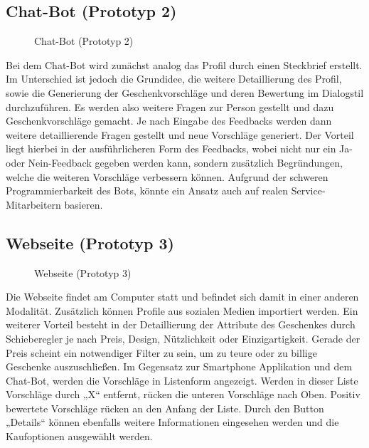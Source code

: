 \documentclass[12pt,ngerman, fleqn]{book} %
\begin{document}
\subsection{Chat-Bot (Prototyp 2)}
\begin{figure}[ht]
    \centering
    \caption{Chat-Bot (Prototyp 2)}
    \label{fig:proto2}
\end{figure}

Bei dem Chat-Bot wird zunächst analog das Profil durch einen Steckbrief erstellt. Im Unterschied ist jedoch die Grundidee, die weitere Detaillierung des Profil, sowie die Generierung der Geschenkvorschläge und deren Bewertung im Dialogstil durchzuführen. Es werden also weitere Fragen zur Person gestellt und dazu Geschenkvorschläge gemacht. Je nach Eingabe des Feedbacks werden dann weitere detaillierende Fragen gestellt und neue Vorschläge generiert. Der Vorteil liegt hierbei in der ausführlicheren Form des Feedbacks, wobei nicht nur ein Ja- oder Nein-Feedback gegeben werden kann, sondern zusätzlich Begründungen, welche die weiteren Vorschläge verbessern können. Aufgrund der schweren Programmierbarkeit des Bots, könnte ein Ansatz auch auf realen Service-Mitarbeitern basieren.

\subsection{Webseite (Prototyp 3)}
\begin{figure}[ht]
    \centering
    \caption{Webseite (Prototyp 3)}
    \label{fig:proto3}
\end{figure}

Die Webseite findet am Computer statt und befindet sich damit in einer anderen Modalität. Zusätzlich können Profile aus sozialen Medien importiert werden. Ein weiterer Vorteil besteht in der Detaillierung der Attribute des Geschenkes durch Schieberegler je nach Preis, Design, Nützlichkeit oder Einzigartigkeit. Gerade der Preis scheint ein notwendiger Filter zu sein, um zu teure oder zu billige Geschenke auszuschließen. Im Gegensatz zur Smartphone Applikation und dem Chat-Bot, werden die Vorschläge in Listenform angezeigt. Werden in dieser Liste Vorschläge durch „X“ entfernt, rücken die unteren Vorschläge nach Oben. Positiv bewertete Vorschläge rücken an den Anfang der Liste. Durch den Button „Details“ können ebenfalls weitere Informationen eingesehen werden und die Kaufoptionen ausgewählt werden. 
\end{document}
